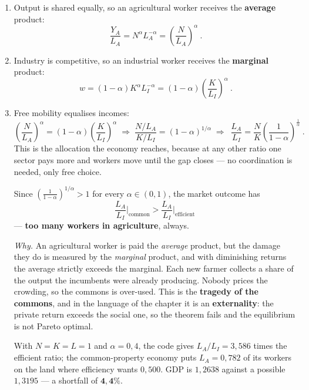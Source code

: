 \documentclass[12pt, letterpaper]{article}
\begin{document}
\begin{tcolorbox}[oddbox,title={Problem 9.13 \quad The Enclosure Acts}]
\begin{enumerate}
\item Output is shared equally, so an agricultural worker receives the \textbf{average}
product:
\[
\boxed{\ \frac{Y_A}{L_A}=N^{\alpha}L_A^{-\alpha}=\left(\frac{N}{L_A}\right)^{\alpha}\ }.
\]

\item Industry is competitive, so an industrial worker receives the \textbf{marginal} product:
\[
\boxed{\ w=(1-\alpha)K^{\alpha}L_I^{-\alpha}=(1-\alpha)\left(\frac{K}{L_I}\right)^{\alpha}\ }.
\]

\item Free mobility equalises incomes:
\[
\left(\frac{N}{L_A}\right)^{\alpha}=(1-\alpha)\left(\frac{K}{L_I}\right)^{\alpha}
\;\Longrightarrow\;
\frac{N/L_A}{K/L_I}=(1-\alpha)^{1/\alpha}
\;\Longrightarrow\;
\boxed{\ \frac{L_A}{L_I}=\frac{N}{K}\left(\frac{1}{1-\alpha}\right)^{\frac{1}{\alpha}}\ }.
\]
This is the allocation the economy reaches, because at any other ratio one sector pays more and
workers move until the gap closes --- no coordination is needed, only free choice.

Since $\left(\frac{1}{1-\alpha}\right)^{1/\alpha}>1$ for every $\alpha\in(0,1)$, the
market outcome has
\[
\frac{L_A}{L_I}\bigg|_{\text{common}}>\frac{L_A}{L_I}\bigg|_{\text{efficient}}
\]
--- \textbf{too many workers in agriculture}, always.

\smallskip
\emph{Why.} An agricultural worker is paid the \emph{average} product, but the damage they do
is measured by the \emph{marginal} product, and with diminishing returns the average strictly
exceeds the marginal. Each new farmer collects a share of the output the incumbents were
already producing. Nobody prices the crowding, so the commons is over-used. This is the
\textbf{tragedy of the commons}, and in the language of the chapter it is an
\textbf{externality}: the private return exceeds the social one, so the theorem fails and the
equilibrium is not Pareto optimal.

\begin{tcolorbox}[databox]
With $N=K=L=1$ and $\alpha=0{,}4$, the code gives $L_A/L_I=3{,}586$ times the efficient ratio;
the common-property economy puts $L_A=0{,}782$ of its workers on the land where efficiency wants
$0{,}500$. GDP is $1{,}2638$ against a possible $1{,}3195$ --- a shortfall of $\mathbf{4{,}4\%}$.
\end{tcolorbox}


\end{enumerate}
\end{tcolorbox}
\end{document}
